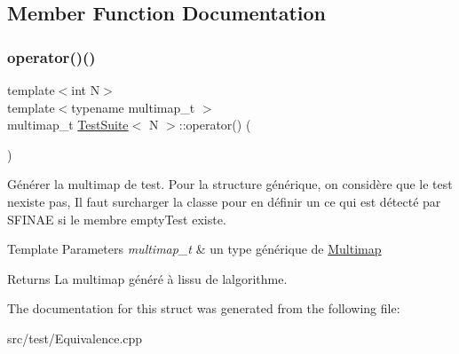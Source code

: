 \subsection{Member Function Documentation}
\mbox{\label{structTestSuite_a791fd382a8eb4d1f4f8d75369d3125dd}} 
\subsubsection{\texorpdfstring{operator()()}{operator()()}}
{\footnotesize\ttfamily template$<$int N$>$ \\
template$<$typename multimap\+\_\+t $>$ \\
multimap\+\_\+t \hyperlink{structTestSuite}{Test\+Suite}$<$ N $>$\+::operator() (\begin{DoxyParamCaption}{ }\end{DoxyParamCaption})\hspace{0.3cm}{\ttfamily [delete]}}

Générer la multimap de test. Pour la structure générique, on considère que le test n\textquotesingle{}existe pas, Il faut surcharger la classe pour en définir un ce qui est détecté par S\+F\+I\+N\+AE si le membre empty\+Test existe.


\begin{DoxyTemplParams}{Template Parameters}
{\em multimap\+\_\+t} & un type générique de \hyperlink{classMultimap}{Multimap} \\
\hline
\end{DoxyTemplParams}
\begin{DoxyReturn}{Returns}
La multimap généré à l\textquotesingle{}issu de l\textquotesingle{}algorithme. 
\end{DoxyReturn}


The documentation for this struct was generated from the following file\+:\begin{DoxyCompactItemize}
\item 
src/test/Equivalence.\+cpp\end{DoxyCompactItemize}
